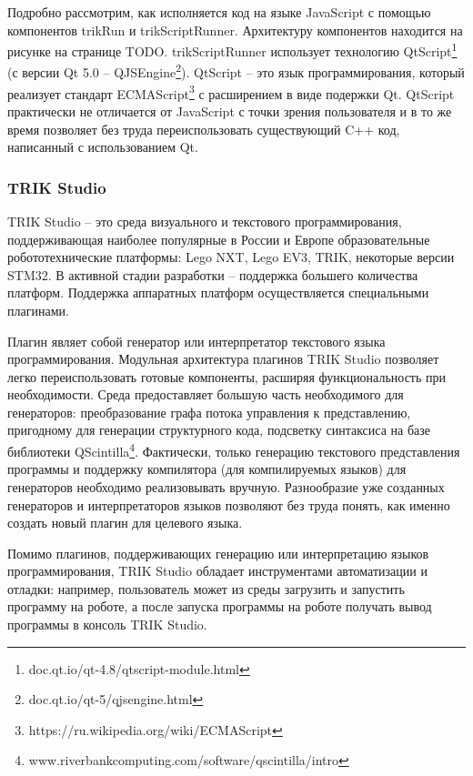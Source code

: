 \documentclass[14pt]{matmex-diploma-custom}
\begin{document}

Подробно рассмотрим, как исполняется код на языке JavaScript с помощью компонентов trikRun и trikScriptRunner. Архитектуру компонентов находится на рисунке на странице TODO. trikScriptRunner использует технологию QtScript\footnote{doc.qt.io/qt-4.8/qtscript-module.html} (с версии Qt 5.0 -- QJSEngine\footnote{doc.qt.io/qt-5/qjsengine.html}). QtScript -- это язык программирования, который реализует стандарт ECMAScript\footnote{https://ru.wikipedia.org/wiki/ECMAScript} с расширением в виде подержки Qt. QtScript практически не отличается от JavaScript с точки зрения пользователя и в то же время позволяет без труда переиспользовать существующий C++ код, написанный с использованием Qt. 

\subsubsection{TRIK Studio}
TRIK Studio -- это среда визуального и текстового программирования, поддерживающая наиболее популярные в России и Европе образовательные робототехнические платформы: Lego NXT, Lego EV3, TRIK, некоторые версии STM32. В активной стадии разработки -- поддержка большего количества платформ. Поддержка аппаратных платформ осуществляется специальными плагинами. 

Плагин являет собой генератор или интерпретатор текстового языка программирования. Модульная архитектура плагинов TRIK Studio позволяет легко переиспользовать готовые компоненты, расширяя функциональность при необходимости. Среда предоставляет большую часть необходимого для генераторов: преобразование графа потока управления к представлению, пригодному для генерации структурного кода, подсветку синтаксиса на базе библиотеки QScintilla\footnote{www.riverbankcomputing.com/software/qscintilla/intro}. Фактически, только генерацию текстового представления программы и поддержку компилятора (для компилируемых языков) для генераторов необходимо реализовывать вручную. Разнообразие уже созданных генераторов и интерпретаторов языков позволяют без труда понять, как именно создать новый плагин для целевого языка.

Помимо плагинов, поддерживающих генерацию или интерпретацию языков программирования, TRIK Studio обладает инструментами автоматизации и отладки: например, пользователь может из среды загрузить и запустить программу на роботе, а после запуска программы на роботе получать вывод программы в консоль TRIK Studio.
\end{document}

